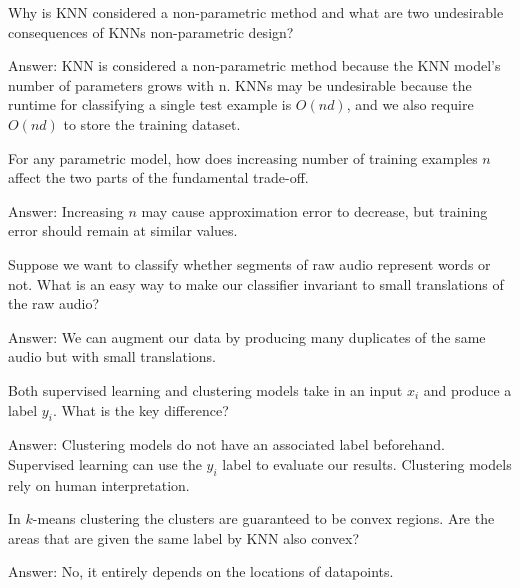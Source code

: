 \documentclass{article}
\def\ans#1{\par\gre{Answer: #1}}
\def\gre#1{{\color{gre}#1}}
\begin{document}
{\item Why is KNN considered a non-parametric method and what are two undesirable consequences of KNNs non-parametric design?
\ans{KNN is considered a non-parametric method because the KNN model's number of parameters grows with n. KNNs may be undesirable because the runtime for classifying a single test example is $O(nd)$, and we also require $O(nd)$ to store the training dataset.}
\item For any parametric model, how does increasing number of training examples $n$ affect the two parts of the fundamental trade-off.
\ans{Increasing $n$ may cause approximation error to decrease, but training error should remain at similar values.}
\item Suppose we want to classify whether segments of raw audio represent words or not. What is an easy way to make our classifier invariant to small translations of the raw audio?
\ans{We can augment our data by producing many duplicates of the same audio but with small translations.}
\item Both supervised learning and clustering models take in an input $x_i$ and produce a label $y_i$. What is the key difference?
\ans{Clustering models do not have an associated label beforehand. Supervised learning can use the $y_i$ label to evaluate our results. Clustering models rely on human interpretation.}
\item In $k$-means clustering the clusters are guaranteed to be convex regions. Are the areas that are given the same label by KNN also convex?
}
\ans{No, it entirely depends on the locations of datapoints.}
\end{document}

